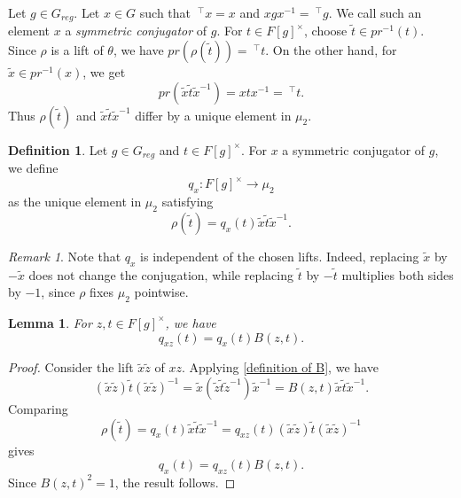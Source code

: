 \documentclass[11pt, a4paper, reqno]{amsart}
\newtheorem{lemma}[theorem]{Lemma}
\theoremstyle{definition}
\newtheorem{definition}[theorem]{Definition}
\theoremstyle{remark}
\newtheorem{remark}[theorem]{Remark}
\theoremstyle{example}
\theoremstyle{note}
\numberwithin{equation}{section}
\begin{document}
Let $g\in G_{reg}$. Let $x\in G$ such that $~^{\top}x=x$ and $xgx^{-1}= ~^{\top}g$. We call such an element $x$ a \textit{symmetric conjugator} of $g$. For $t\in F[g]^{\times}$, choose 
 $\tilde t\in pr^{-1}(t)$.  Since $\rho$ is a lift of $\theta$, we have $pr(\rho(\tilde{t}))= ~^{\top}t.$
On the other hand, for $\tilde{x}\in pr^{-1}(x)$, we get $$pr(\tilde{x}\tilde{t}\tilde{x}^{-1})
=xtx^{-1}= ~^{\top}t.$$
Thus $\rho(\tilde{t})$ and $\tilde{x}\tilde{t}\tilde{x}^{-1}$ differ by a unique element in $\mu_{2}$.

\begin{definition}\label{def:q-x} Let $g\in G_{reg}$ and $t\in F[g]^{\times}$. For $x$ a symmetric conjugator of $g$, we define
\begin{equation*}
q_x:F[g]^\times\longrightarrow\mu_2
\end{equation*}
as the unique element in $\mu_{2}$ satisfying \begin{equation*}
\rho(\tilde{t})
=q_x(t)\tilde{x}\tilde{t}\tilde{x}^{-1}.
\end{equation*}
\end{definition}

\begin{remark} Note that $q_{x}$ is independent of the chosen lifts. Indeed, replacing $\tilde{x}$ by $-\tilde{x}$ does not change the conjugation, while
replacing $\tilde{t}$ by $-\tilde{t}$ multiplies both sides by $-1$, 
since $\rho$ fixes $\mu_{2}$ pointwise.
\end{remark}






\begin{lemma}\label{lem:change-conjugator} For $z,t\in F[g]^{\times}$, we have
\[q_{xz}(t)=q_x(t)B(z,t).\]
\end{lemma}

\begin{proof} Consider the lift $\tilde{x}\tilde{z}$ of $xz$. Applying  \eqref{definition of B}, we have
\[
(\tilde{x}\tilde{z})\tilde{t}
(\tilde{x}\tilde{z})^{-1}
=\tilde{x}(\tilde{z}\tilde{t}\tilde{z}^{-1})\tilde{x}^{-1}
=B(z,t)\tilde{x}\tilde{t}\tilde{x}^{-1}.
\]
Comparing
\[
\rho(\tilde{t})
=q_x(t)\tilde{x}\tilde{t}\tilde{x}^{-1}
=q_{xz}(t)(\tilde{x}\tilde{z})
\tilde{t}(\tilde{x}\tilde{z})^{-1}
\]
gives
\begin{equation*}
q_x(t)=q_{xz}(t)B(z,t).
\end{equation*}
Since $B(z,t)^2=1$, the result follows.
\end{proof}
\end{document}
